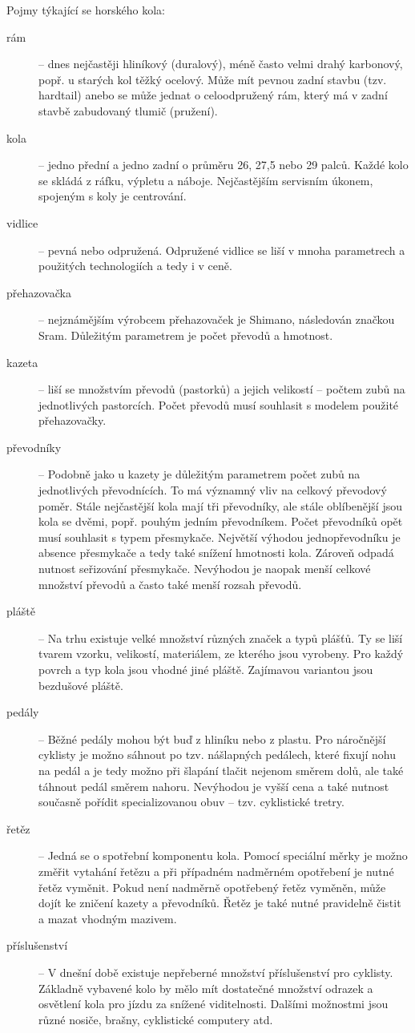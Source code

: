 \documentclass[a4paper]{article}
\begin{document}
Pojmy týkající se horského kola:
\begin{description}

\item [rám] -- dnes nejčastěji hliníkový (duralový), méně často velmi drahý karbonový, popř. u starých kol těžký ocelový. Může mít pevnou zadní stavbu (tzv. hardtail) anebo se může jednat o celoodpružený rám, který má v zadní stavbě zabudovaný tlumič (pružení).
\item [kola] -- jedno přední a jedno zadní o průměru 26, 27,5 nebo 29 palců. Každé kolo se skládá z ráfku, výpletu a náboje. Nejčastějším servisním úkonem, spojeným s koly je centrování.
\item [vidlice] -- pevná nebo odpružená. Odpružené vidlice se liší v mnoha parametrech a použitých technologiích a tedy i v ceně.
\item [přehazovačka] -- nejznámějším výrobcem přehazovaček je Shimano, následován značkou Sram. Důležitým parametrem je počet převodů a hmotnost.
\item [kazeta] -- liší se množstvím převodů (pastorků) a jejich velikostí -- počtem zubů na jednotlivých pastorcích. Počet převodů musí souhlasit s modelem použité přehazovačky.
\item [převodníky] -- Podobně jako u kazety je důležitým parametrem počet zubů na jednotlivých převodnících. To má významný vliv na celkový převodový poměr. Stále nejčastější kola mají tři převodníky, ale stále oblíbenější jsou kola se dvěmi, popř. pouhým jedním převodníkem. Počet převodníků opět musí souhlasit s typem přesmykače. Největší výhodou jednopřevodníku je absence přesmykače a tedy také snížení hmotnosti kola. Zároveň odpadá nutnost seřizování přesmykače. Nevýhodou je naopak menší celkové množství převodů a často také menší rozsah převodů.
\item [pláště] -- Na trhu existuje velké množství různých značek a typů plášťů. Ty se liší tvarem vzorku, velikostí, materiálem, ze kterého jsou vyrobeny. Pro každý povrch a typ kola jsou vhodné jiné pláště. Zajímavou variantou jsou bezdušové pláště.
\item [pedály] -- Běžné pedály mohou být buď z hliníku nebo z plastu. Pro náročnější cyklisty je možno sáhnout po tzv. nášlapných pedálech, které fixují nohu na pedál a je tedy možno při šlapání tlačit nejenom směrem dolů, ale také táhnout pedál směrem nahoru. Nevýhodou je vyšší cena a také nutnost současně pořídit specializovanou obuv -- tzv. cyklistické tretry.
\item [řetěz] -- Jedná se o spotřební komponentu kola. Pomocí speciální měrky je možno změřit vytahání řetězu a při případném nadměrném opotřebení je nutné řetěz vyměnit. Pokud není nadměrně opotřebený řetěz vyměněn, může dojít ke zničení kazety a převodníků. Řetěz je také nutné pravidelně čistit a mazat vhodným mazivem.
\item [příslušenství] -- V dnešní době existuje nepřeberné množství příslušenství pro cyklisty. Základně vybavené kolo by mělo mít dostatečné množství odrazek a osvětlení kola pro jízdu za snížené viditelnosti. Dalšími možnostmi jsou různé nosiče, brašny, cyklistické computery atd.

\end{description}
\end{document}
